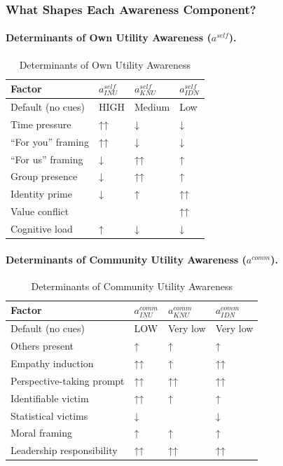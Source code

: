\subsubsection{What Shapes Each Awareness Component?}

\paragraph{Determinants of Own Utility Awareness ($a^{self}$).}

\begin{table}[htbp]
\centering
\caption{Determinants of Own Utility Awareness}
\label{tab:determinants-self}
\renewcommand{\arraystretch}{1.3}
\begin{tabular}{@{}llll@{}}
\toprule
\textbf{Factor} & $a^{self}_{INU}$ & $a^{self}_{KNU}$ & $a^{self}_{IDN}$ \\
\midrule
Default (no cues) & HIGH & Medium & Low \\
Time pressure & ↑↑ & ↓ & ↓ \\
``For you'' framing & ↑↑ & ↓ & ↓ \\
``For us'' framing & ↓ & ↑↑ & ↑ \\
Group presence & ↓ & ↑↑ & ↑ \\
Identity prime & ↓ & ↑ & ↑↑ \\
Value conflict & ~ & ~ & ↑↑ \\
Cognitive load & ↑ & ↓ & ↓ \\
\bottomrule
\end{tabular}
\end{table}

\paragraph{Determinants of Community Utility Awareness ($a^{comm}$).}

\begin{table}[htbp]
\centering
\caption{Determinants of Community Utility Awareness}
\label{tab:determinants-community}
\renewcommand{\arraystretch}{1.3}
\begin{tabular}{@{}llll@{}}
\toprule
\textbf{Factor} & $a^{comm}_{INU}$ & $a^{comm}_{KNU}$ & $a^{comm}_{IDN}$ \\
\midrule
Default (no cues) & LOW & Very low & Very low \\
Others present & ↑ & ↑ & ↑ \\
Empathy induction & ↑↑ & ↑ & ↑↑ \\
Perspective-taking prompt & ↑↑ & ↑↑ & ↑↑ \\
Identifiable victim & ↑↑ & ↑ & ↑ \\
Statistical victims & ↓ & ~ & ↓ \\
Moral framing & ↑ & ↑ & ↑ \\
Leadership responsibility & ↑↑ & ↑↑ & ↑↑ \\
\bottomrule
\end{tabular}
\end{table}

